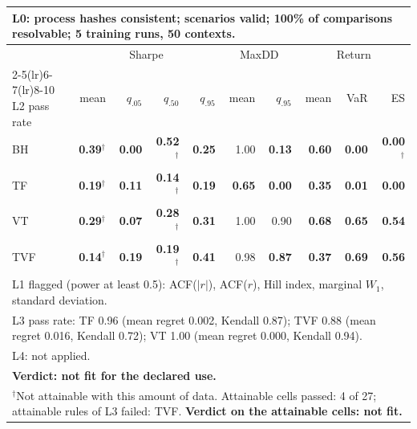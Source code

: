 \begin{tabular}{lrrrrrrrrr}
\toprule
\multicolumn{10}{p{13.5cm}}{L0: process hashes consistent; scenarios valid; 100\% of comparisons resolvable; 5 training runs, 50 contexts.} \\
\midrule
 & \multicolumn{4}{c}{Sharpe} & \multicolumn{2}{c}{MaxDD} & \multicolumn{3}{c}{Return} \\
\cmidrule(lr){2-5}\cmidrule(lr){6-7}\cmidrule(lr){8-10}
L2 pass rate & mean & $q_{.05}$ & $q_{.50}$ & $q_{.95}$ & mean & $q_{.95}$ & mean & VaR & ES \\
\midrule
BH & \textbf{0.39}$^{\dagger}$ & \textbf{0.00} & \textbf{0.52}$^{\dagger}$ & \textbf{0.25} & 1.00 & \textbf{0.13} & \textbf{0.60} & \textbf{0.00} & \textbf{0.00}$^{\dagger}$ \\
TF & \textbf{0.19}$^{\dagger}$ & \textbf{0.11} & \textbf{0.14}$^{\dagger}$ & \textbf{0.19} & \textbf{0.65} & \textbf{0.00} & \textbf{0.35} & \textbf{0.01} & \textbf{0.00} \\
VT & \textbf{0.29}$^{\dagger}$ & \textbf{0.07} & \textbf{0.28}$^{\dagger}$ & \textbf{0.31} & 1.00 & 0.90 & \textbf{0.68} & \textbf{0.65} & \textbf{0.54} \\
TVF & \textbf{0.14}$^{\dagger}$ & \textbf{0.19} & \textbf{0.19}$^{\dagger}$ & \textbf{0.41} & 0.98 & \textbf{0.87} & \textbf{0.37} & \textbf{0.69} & \textbf{0.56} \\
\midrule
\multicolumn{10}{p{13.5cm}}{L1 flagged (power at least 0.5): ACF($|r|$), ACF($r$), Hill index, marginal $W_1$, standard deviation.} \\
\multicolumn{10}{p{13.5cm}}{L3 pass rate: TF 0.96 (mean regret 0.002, Kendall 0.87); TVF 0.88 (mean regret 0.016, Kendall 0.72); VT 1.00 (mean regret 0.000, Kendall 0.94).} \\
\multicolumn{10}{p{13.5cm}}{L4: not applied.} \\
\multicolumn{10}{p{13.5cm}}{\textbf{Verdict: not fit for the declared use.}} \\
\multicolumn{10}{p{13.5cm}}{$^{\dagger}$Not attainable with this amount of data. Attainable cells passed: 4 of 27; attainable rules of L3 failed: TVF. \textbf{Verdict on the attainable cells: not fit.}} \\
\bottomrule
\end{tabular}
